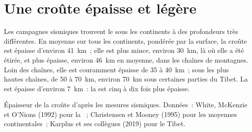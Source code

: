 \section{Une croûte épaisse et légère}

Les campagnes sismiques trouvent le  sous les continents à des
profondeurs très différentes. En moyenne sur tous les continents, pondérée
par la surface, la croûte est épaisse d'environ \qty{41}{km}~; elle est
plus mince, environ \qty{30}{km}, là où elle a été étirée, et plus épaisse,
environ \qty{46}{km} en moyenne, dans les chaînes de montagnes. Loin des
chaînes, elle est couramment épaisse de 35 à \qty{40}{km}~; sous les plus
hautes chaînes, de 50 à \qty{70}{km}, environ \qty{70}{km} sous certaines
parties du Tibet. La  est épaisse d'environ \qty{7}{km}~:
la  est cinq à dix fois plus épaisse.

\begin{omfigure}

{\small Épaisseur de la croûte d'après les mesures sismiques. Données~:
White, McKenzie et O'Nions (1992) pour la ~; Christensen et
Mooney (1995) pour les moyennes continentales~; Karplus et ses collègues
(2019) pour le Tibet.}
\end{omfigure}

